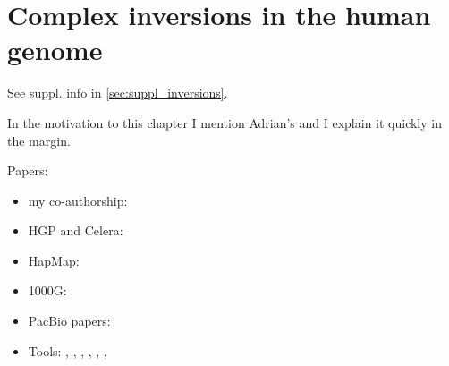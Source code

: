 \chapter{Complex inversions in the human genome}
\label{sec:inversions}

See suppl. info in \cref{sec:suppl_inversions}.

In the motivation to this chapter I mention Adrian's  and I explain it quickly in the margin.


Papers:
\begin{itemize}
\item my co-authorship: \citep{Sudmant2015}
\item HGP and Celera: \citep{Lander2001,Venter2001}
\item HapMap: \citep{InternationalHapMapConsortium2005,Frazer2007,Altshuler2010}
\item 1000G: \citep{Durbin2010,1000GenomesProjectConsortium2012,Auton2015}
\item PacBio papers: \citep{Chaisson2014,Pendleton2015}
\item Tools: \blasr, \last, \mummer, \bwamem, \quiver, \celeraassembler, \maze
\end{itemize}



%
%
%
%


